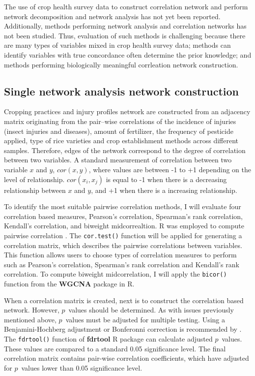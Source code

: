 The use of crop health survey data to construct correlation network and perform network decomposition and network analysis has not yet been reported. Additionally, methods performing network analysis and correlation networks has not been studied. Thus, evaluation of such methods is challenging because there are many types of variables mixed in crop health survey data; methods can identify variables with true concordance often determine the prior knowledge; and methods performing biologically meaningful corrleation network construction. 

\subsection*{Single network analysis network construction}

Cropping practices and injury profiles network are constructed from an adjacency matrix originating from the pair--wise correlations of the incidence of injuries (insect injuries and diseases), amount of fertilizer, the frequency of pesticide applied, type of rice varieties and crop establishment methods across different samples. Therefore, edges of the network correspond to the degree of correlation between two variables. A standard measurement of correlation between two variable $x$ and $y$, $cor(x,y)$, where values are  between -1 to +1 depending on the level of relationship. $cor(x_{i}, x_{j})$ is equal to -1 when there is a decreasing relationship between $x$ and $y$, and +1 when there is a increasing relationship.

To identify the most suitable pairwise correlation methods, I will evaluate four correlation based measures, Pearson's correlation, Spearman's rank correlation, Kendall's correlation, and biweight midcorrealtion. R was employed to compute pairwise correlation . The \texttt{cor.test()} function will be applied for generating a correlation matrix, which describes the pairwise correlations between variables. This function allows users to choose types of correlation measures to perform such as Pearson's correlation, Spearman's rank correlation and Kendall's rank correlation. To compute biweight midcorrelation, I will apply the \texttt{bicor()} function from the \textbf{WGCNA} package  in R. 

When a correlation matrix is created, next is to construct the correlation based network. However, $p$~values should be determined. As with issues previously mentioned above, $p$~values must be adjusted for multiple testing. Using a Benjamini-Hochberg adjustment or Bonferonni correction is recommended by .  The \texttt{fdrtool()} function of \textbf{fdrtool} R package can calculate adjusted $p$~values. These values are compared to a standard 0.05 significance level. The final correlation matrix contains pair-wise correlation coefficients, which have adjusted for $p$~values lower than 0.05 significance level. 

